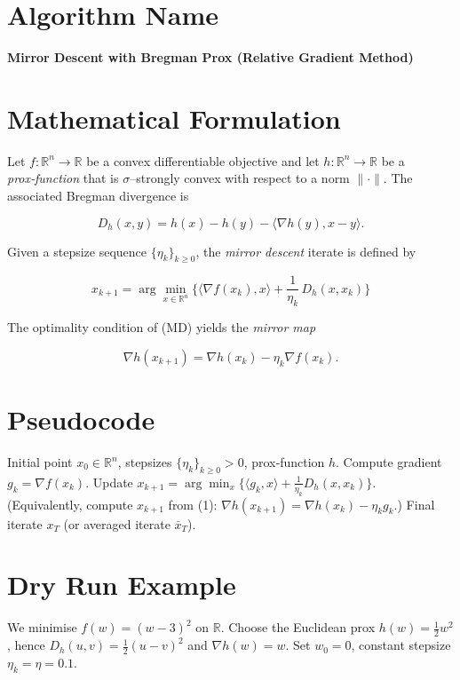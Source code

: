 \documentclass{article}
\newcommand{\inner}[2]{\langle #1,#2\rangle}
\newcommand{\D}[2]{D_{h}(#1,#2)}
\newcommand{\grad}{\nabla}
\begin{document}
\section*{Algorithm Name}
\textbf{Mirror Descent with Bregman Prox (Relative Gradient Method)}

\section*{Mathematical Formulation}
Let $f:\mathbb{R}^{n}\to\mathbb{R}$ be a convex differentiable objective and let $h:\mathbb{R}^{n}\to\mathbb{R}$ be a \emph{prox‑function} that is $\sigma$–strongly convex with respect to a norm $\|\cdot\|$.
The associated Bregman divergence is  

\[
\D{x}{y}=h(x)-h(y)-\inner{\grad h(y)}{x-y}.
\]

Given a stepsize sequence $\{\eta_k\}_{k\ge 0}$, the \emph{mirror descent} iterate is defined by  

\[
\boxed{\;
x_{k+1}= \arg\min_{x\in\mathbb{R}^{n}}
\Big\{ \inner{\grad f(x_k)}{x} + \frac{1}{\eta_k}\,\D{x}{x_k}\Big\}
\;}
\tag{MD}
\]

The optimality condition of (MD) yields the \emph{mirror map}  

\[
\grad h(x_{k+1}) = \grad h(x_k)-\eta_k \grad f(x_k). \tag{1}
\]

\section*{Pseudocode}
\begin{algorithm}[H]
\caption{Mirror Descent (Bregman Prox)}
\begin{algorithmic}[1]
\REQUIRE Initial point $x_0\in\mathbb{R}^{n}$, stepsizes $\{\eta_k\}_{k\ge0}>0$, prox‑function $h$.
    \STATE Compute gradient $g_k=\grad f(x_k)$.
    \STATE Update $x_{k+1}= \arg\min_{x}\Big\{ \inner{g_k}{x}+ \frac{1}{\eta_k}\D{x}{x_k}\Big\}$.
    \STATE (Equivalently, compute $x_{k+1}$ from (1): $\grad h(x_{k+1})=\grad h(x_k)-\eta_k g_k$.)
\ENDFOR
\ENSURE Final iterate $x_T$ (or averaged iterate $\bar x_T$).
\end{algorithmic}
\end{algorithm}

\section*{Dry Run Example}
We minimise $f(w)=(w-3)^2$ on $\mathbb{R}$.
Choose the Euclidean prox $h(w)=\tfrac12 w^{2}$, hence $\D{u}{v}= \tfrac12 (u-v)^2$ and $\grad h(w)=w$.
Set $w_0=0$, constant stepsize $\eta_k=\eta=0.1$.
\end{document}
